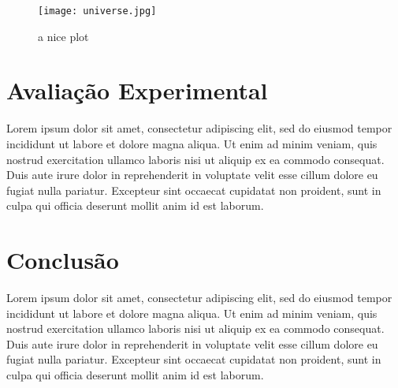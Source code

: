 \documentclass[10pt, a4paper,twocolumn]{article}
\begin{document}
\begin{figure}[h]
    \centering
    \texttt{[image: universe.jpg]}
    \caption{a nice plot}
    \label{fig:mesh1}
\end{figure}

\section{Avaliação Experimental}
Lorem ipsum dolor sit amet, consectetur adipiscing elit, sed do eiusmod tempor incididunt ut labore et dolore magna aliqua. Ut enim ad minim veniam, quis nostrud exercitation ullamco laboris nisi ut aliquip ex ea commodo consequat. Duis aute irure dolor in reprehenderit in voluptate velit esse cillum dolore eu fugiat nulla pariatur. Excepteur sint occaecat cupidatat non proident, sunt in culpa qui officia deserunt mollit anim id est laborum.

\section{Conclusão}
Lorem ipsum dolor sit amet, consectetur adipiscing elit, sed do eiusmod tempor incididunt ut labore et dolore magna aliqua. Ut enim ad minim veniam, quis nostrud exercitation ullamco laboris nisi ut aliquip ex ea commodo consequat. Duis aute irure dolor in reprehenderit in voluptate velit esse cillum dolore eu fugiat nulla pariatur. Excepteur sint occaecat cupidatat non proident, sunt in culpa qui officia deserunt mollit anim id est laborum.

\printbibliography
\end{document}
